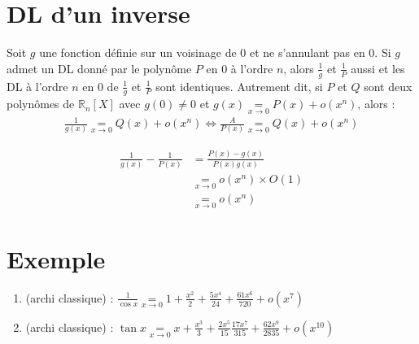 \documentclass[../main.tex]{subfiles}
\begin{document}
\section{DL d'un inverse}
\begin{tcolorbox}[title=Propostion 25.65, title filled=false, colframe=lightblue, colback=lightblue!10!white]
    Soit $g$ une fonction définie sur un voisinage de $0$ et ne s'annulant pas en $0$. Si $g$ admet un DL donné par le polynôme $P$ en $0$ à l'ordre $n$, alors $\frac{1}{g}$ et $\frac{1}{P}$ aussi et les DL à l'ordre $n$ en $0$ de $\frac{1}{g}$ et $\frac{1}{P}$ sont identiques. Autrement dit, si $P$ et $Q$ sont deux polynômes de $\mathbb{R}_n[X]$ avec $g(0) \neq 0$ et $g(x) \underset{x\to 0}{=} P(x) + o(x^n)$, alors : 
    \begin{align*}
        \frac{1}{g(x)} \underset{x\to 0}{=} Q(x) + o(x^n) \Leftrightarrow \frac{A}{P(x)} \underset{x\to 0}{=} Q(x) + o(x^n)
    \end{align*}
\end{tcolorbox}

\begin{align*}
    \frac{1}{g(x)} - \frac{1}{P(x)} &= \frac{P(x) - g(x)}{P(x)g(x)} \\
    &\underset{x\to 0}{=} o(x^n) \times O(1) \\
    &\underset{x\to 0}{=} o(x^n)
\end{align*}

\section{Exemple}
\begin{tcolorbox}[title=Exemple 25.67, title filled=false, colframe=darkgreen, colback=darkgreen!10!white]
    \begin{enumerate}
        \item (archi classique) : $\frac{1}{\cos x} \underset{x\to 0}{=} 1 + \frac{x^2}{2} + \frac{5x^4}{24} + \frac{61x^6}{720} + o(x^7)$
        \item (archi classique) : $\tan x \underset{x\to 0}{=} x + \frac{x^3}{3} + \frac{2x^5}{15}  \frac{17x^7}{315} + \frac{62x^9}{2835} + o(x^{10})$
    \end{enumerate}
\end{tcolorbox}
\end{document}
